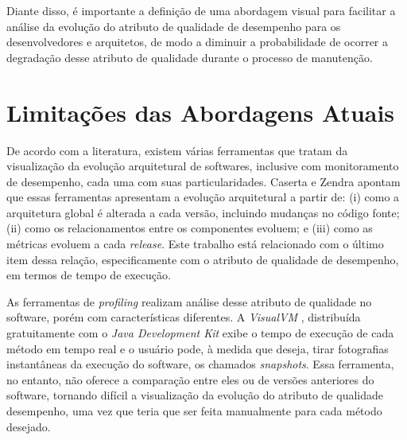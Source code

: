 
Diante disso, é importante a definição de uma abordagem visual para facilitar a análise da evolução do atributo de qualidade de desempenho para os desenvolvedores e arquitetos, de modo a diminuir a probabilidade de ocorrer a degradação desse atributo de qualidade durante o processo de manutenção.

\section{Limitações das Abordagens Atuais} \label{sec:limitacao-abordagens-atuais}

De acordo com a literatura, existem várias ferramentas que tratam da visualização da evolução arquitetural de softwares, inclusive com monitoramento de desempenho, cada uma com suas particularidades. Caserta e Zendra \cite{Caserta2011} apontam que essas ferramentas apresentam a evolução arquitetural a partir de: (i) como a arquitetura global é alterada a cada versão, incluindo mudanças no código fonte; (ii) como os relacionamentos entre os componentes evoluem; e (iii) como as métricas evoluem a cada \textit{release}. Este trabalho está relacionado com o último item dessa relação, especificamente com o atributo de qualidade de desempenho, em termos de tempo de execução.

As ferramentas de \textit{profiling} realizam análise desse atributo de qualidade no software, porém com características diferentes. A \textit{VisualVM} \cite{Vis}, distribuída gratuitamente com o \textit{Java Development Kit} exibe o tempo de execução de cada método em tempo real e o usuário pode, à medida que deseja, tirar fotografias instantâneas da execução do software, os chamados \textit{snapshots}. Essa ferramenta, no entanto, não oferece a comparação entre eles ou de versões anteriores do software, tornando difícil a visualização da evolução do atributo de qualidade desempenho, uma vez que teria que ser feita manualmente para cada método desejado.

